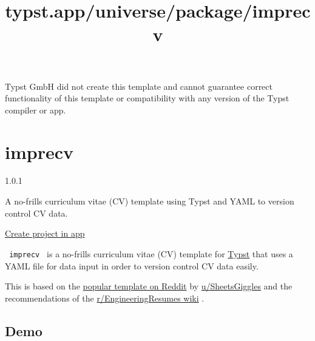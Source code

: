 Typst GmbH did not create this template and cannot guarantee correct
functionality of this template or compatibility with any version of the
Typst compiler or app.


\title{typst.app/universe/package/imprecv}

\label{banner}
\label{template-thumbnail}

\section{imprecv}\label{imprecv}

{ 1.0.1 }

A no-frills curriculum vitae (CV) template using Typst and YAML to
version control CV data.

\href{/app?template=imprecv&version=1.0.1}{Create project in app}

\label{readme}
\href{https://github.com/jskherman/imprecv/stargazers}{\pandocbounded{}}
\href{https://github.com/typst/packages/raw/main/packages/preview/imprecv/1.0.1/LICENSE}{}
\href{https://github.com/jskherman/imprecv/releases}{}

\texttt{\ imprecv\ } is a no-frills curriculum vitae (CV) template for
\href{https://github.com/typst/typst}{Typst} that uses a YAML file for
data input in order to version control CV data easily.

This is based on the
\href{https://web.archive.org/https://old.reddit.com/r/jobs/comments/7y8k6p/im_an_exrecruiter_for_some_of_the_top_companies/}{popular
template on Reddit} by
\href{https://web.archive.org/https://old.reddit.com/user/SheetsGiggles}{u/SheetsGiggles}
and the recommendations of the
\href{https://web.archive.org/https://old.reddit.com/r/EngineeringResumes/comments/m2cc65/new_and_improved_wiki}{r/EngineeringResumes
wiki} .

\subsection{Demo}\label{demo}

